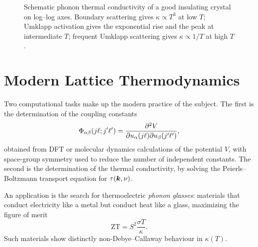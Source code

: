 \begin{figure}[ht]
\centering
{}
\caption{Schematic phonon thermal conductivity of a good insulating crystal on log--log axes. Boundary scattering gives $\kappa \propto T^3$ at low $T$; Umklapp activation gives the exponential rise and the peak at intermediate $T$; frequent Umklapp scattering gives $\kappa \propto 1/T$ at high $T$.}
\label{fig:phon-kappa}
\end{figure}

\section{Modern Lattice Thermodynamics}

Two computational tasks make up the modern practice of the subject. The first is the determination of the coupling constants
\begin{equation}
    \Phi_{\alpha\beta}(j\ell; j'\ell') = \pdv{V}{u_\alpha(j\ell)}{u_\beta(j'\ell')},
\end{equation}
obtained from DFT or molecular dynamics calculations of the potential $V$, with space-group symmetry used to reduce the number of independent constants. The second is the determination of the thermal conductivity, by solving the Peierls--Boltzmann transport equation for $\tau(\bm{k},\nu)$.

An application is the search for thermoelectric \emph{phonon glasses}: materials that conduct electricity like a metal but conduct heat like a glass, maximizing the figure of merit
\begin{equation}
    \mathrm{ZT} = S^2 \frac{\sigma T}{\kappa}.
\end{equation}
Such materials show distinctly non-Debye--Callaway behaviour in $\kappa(T)$.

